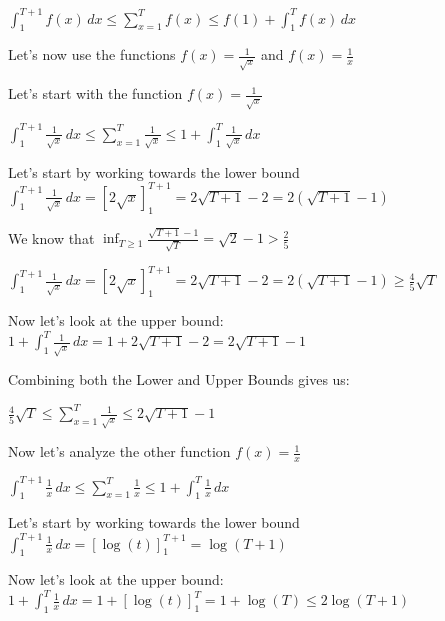 $\int_{1}^{T + 1} f(x) \,dx \leq \sum_{x=1}^{T} f(x) \leq f(1) + \int_{1}^{T} f(x) \,dx$ \newline 


Let's now use the functions $f(x) = \frac{1}{\sqrt{x}}$ and $f(x) = \frac{1}{x}$

Let's start with the function $f(x) = \frac{1}{\sqrt{x}}$ \newline 

$\int_{1}^{T + 1} \frac{1}{\sqrt{x}} \,dx \leq \sum_{x=1}^{T} \frac{1}{\sqrt{x}} \leq 1 + \int_{1}^{T} \frac{1}{\sqrt{x}} \,dx$ \newline 

Let's start by working towards the lower bound \newline 
$\int_{1}^{T + 1} \frac{1}{\sqrt{x}} \,dx = [2 \sqrt{x}]_1^{T + 1}  = 2 \sqrt{T + 1} - 2 = 2(\sqrt{T + 1} - 1)$ \newline 


We know that $\inf_{T \geq 1} \frac{\sqrt{T + 1} - 1}{\sqrt{T}} = \sqrt{2} - 1 > \frac{2}{5}$ \newline 

$\int_{1}^{T + 1} \frac{1}{\sqrt{x}} \,dx = [2 \sqrt{x}]_1^{T + 1}  = 2 \sqrt{T + 1} - 2 = 2(\sqrt{T + 1} - 1) \geq \frac{4}{5} \sqrt{T}$ \newline 

Now let's look at the upper bound: \newline 
$ 1 + \int_{1}^{T} \frac{1}{\sqrt{x}} \,dx = 1 + 2 \sqrt{T + 1} - 2  = 2 \sqrt{T + 1} - 1 $

Combining both the Lower and Upper Bounds gives us: \newline 


$\frac{4}{5} \sqrt{T} \leq \sum_{x=1}^{T} \frac{1}{\sqrt{x}} \leq 2 \sqrt{T + 1} - 1 $ \newline 

Now let's analyze the other function $f(x) = \frac{1}{x}$ \newline 

$\int_{1}^{T + 1} \frac{1}{x} \,dx \leq \sum_{x=1}^{T} \frac{1}{x} \leq 1 + \int_{1}^{T} \frac{1}{x} \,dx$ \newline 

Let's start by working towards the lower bound \newline 
$\int_{1}^{T + 1} \frac{1}{x} \,dx = [\log(t)]_1^{T + 1} = \log(T + 1)$ \newline 

Now let's look at the upper bound: \newline 
$1 + \int_{1}^{T} \frac{1}{x} \,dx = 1 + [\log(t)]_1^{T} = 1 + \log(T) \leq 2 \log(T + 1)$

